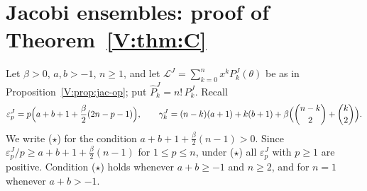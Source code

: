 \documentclass[11pt,a4paper]{article}
\theoremstyle{definition}
\theoremstyle{remark}
\numberwithin{equation}{section}
\begin{document}
\section{Jacobi ensembles: proof of Theorem~\ref{V:thm:C}}\label{V:sec:jac}

Let $\beta>0$, $a,b>-1$, $n\ge1$, and let $\mathcal L^J=\sum_{k=0}^{n}x^kP^J_k(\theta)$ be as in Proposition~\ref{V:prop:jac-op}; put $\hat P^J_k=n!\,P^J_k$. Recall
\[
\varepsilon^J_p=p\Bigl(a+b+1+\frac\beta2(2n-p-1)\Bigr),\qquad\gamma^J_k=(n-k)(a+1)+k(b+1)+\beta\Bigl(\binom{n-k}2+\binom k2\Bigr).
\]
We write \textup{($\star$)} for the condition $a+b+1+\frac\beta2(n-1)>0$. Since $\varepsilon^J_p/p\ge a+b+1+\frac\beta2(n-1)$ for $1\le p\le n$, under \textup{($\star$)} all $\varepsilon^J_p$ with $p\ge1$ are positive. Condition \textup{($\star$)} holds whenever $a+b\ge-1$ and $n\ge2$, and for $n=1$ whenever $a+b>-1$.
\end{document}
